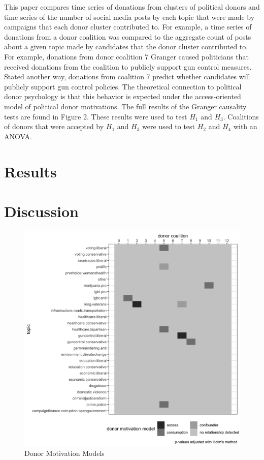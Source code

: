 \documentclass[12pt,]{article}
\begin{document}
This paper compares time series of donations from clusters of political
donors and time series of the number of social media posts by each topic
that were made by campaigns that each donor cluster contributed to. For
example, a time series of donations from a donor coalition was compared
to the aggregate count of posts about a given topic made by candidates
that the donor cluster contributed to. For example, donations from donor
coalition 7 Granger caused politicians that received donations from the
coalition to publicly support gun control measures. Stated another way,
donations from coalition 7 predict whether candidates will publicly
support gun control policies. The theoretical connection to political
donor psychology is that this behavior is expected under the
access-oriented model of political donor motivations. The full results
of the Granger causality tests are found in Figure 2. These results were
used to test \(H_{1}\) and \(H_{3}\). Coalitions of donors that were
accepted by \(H_{1}\) and \(H_{3}\) were used to test \(H_{2}\) and
\(H_{4}\) with an ANOVA.

\hypertarget{results}{%
\section{Results}\label{results}}

\hypertarget{discussion}{%
\section{Discussion}\label{discussion}}

\begin{figure}
\centering
\includegraphics{../tables_and_figures/aejmc_abstract_1.jpg}
\caption{Donor Motivation Models}
\end{figure}
\end{document}
